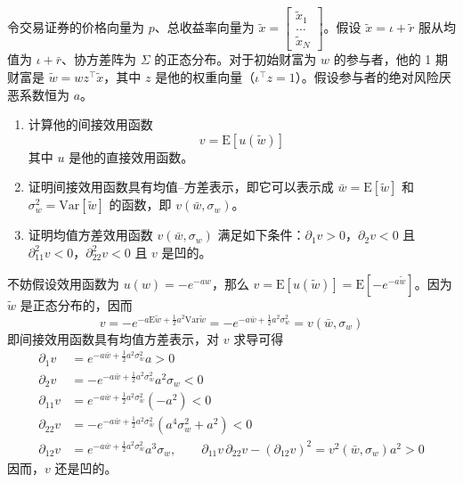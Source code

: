 
\begin{problem}
 令交易证券的价格向量为 $p$、总收益率向量为 $\tilde{x}=\begin{bmatrix}\tilde{x}_{1} \\ \dots \\ \tilde{x}_{N}\end{bmatrix}$。假设 $\tilde{x}=\iota+\tilde{r}$ 服从均值为 $\iota+\bar{r}$、协方差阵为 $\Sigma$ 的正态分布。对于初始财富为 $w$ 的参与者，他的 1 期财富是 $\tilde{w}=wz^{\top}\tilde{x}$，其中 $z$ 是他的权重向量（$\iota^{\top}z=1$）。假设参与者的绝对风险厌恶系数恒为 $a$。
\begin{enumerate}[label=(\alph*)]
    \item 计算他的间接效用函数
    \[
        v=\mathrm{E}[u(\tilde{w})]
    \]
    其中 $u$ 是他的直接效用函数。
    \item 证明间接效用函数具有均值--方差表示，即它可以表示成 $\bar{w}=\mathrm{E}[\tilde{w}]$ 和 $\sigma_{w}^{2}=\mathrm{Var}[\tilde{w}]$ 的函数，即 $v(\bar{w},\sigma_{w})$。
    \item 证明均值方差效用函数 $v(\bar{w},\sigma_{w})$ 满足如下条件：$\partial_{1}v>0$，$\partial_{2}v<0$ 且 $\partial_{11}^{2}v<0$，$\partial_{22}^{2}v<0$ 且 $v$ 是凹的。
\end{enumerate}
\end{problem}
\begin{solution}
不妨假设效用函数为 $u(w)=-e^{-aw}$，那么 $v=\mathrm{E}[u(\tilde{w})]=\mathrm{E}[-e^{-a\tilde{w}}]$。因为 $\tilde{w}$ 是正态分布的，因而
\[
    v=-e^{-a\mathrm{E}\tilde{w}+\frac12 a^{2}\mathrm{Var}\tilde{w}}=-e^{-a\bar{w}+\frac12 a^{2}\sigma_{w}^{2}}=v(\bar{w},\sigma_{w})
\]
即间接效用函数具有均值方差表示，对 $v$ 求导可得
\[
    \begin{aligned}
        \partial_{1}v&=e^{-a\bar{w}+\frac12 a^{2}\sigma_{w}^{2}}a>0\\
        \partial_{2}v&=-e^{-a\bar{w}+\frac12 a^{2}\sigma_{w}^{2}}a^{2}\sigma_{w}<0\\
        \partial_{11}v&=e^{-a\bar{w}+\frac12 a^{2}\sigma_{w}^{2}}(-a^{2})<0\\
        \partial_{22}v&=-e^{-a\bar{w}+\frac12 a^{2}\sigma_{w}^{2}}(a^{4}\sigma_{w}^{2}+a^{2})<0\\
        \partial_{12}v&=e^{-a\bar{w}+\frac12 a^{2}\sigma_{w}^{2}}a^{3}\sigma_{w},\qquad
        \partial_{11}v\,\partial_{22}v-(\partial_{12}v)^{2}=v^{2}(\bar{w},\sigma_{w})a^{2}>0
    \end{aligned}
\]
因而，$v$ 还是凹的。
\end{solution}

